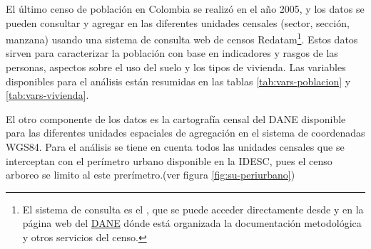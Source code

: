 \documentclass[12pt,]{book}
\let\rmarkdownfootnote\footnote%
\def\footnote{\protect\rmarkdownfootnote}
\begin{document}
El último censo de población en Colombia se realizó en el año 2005, y
los datos se pueden consultar y agregar en las diferentes unidades
censales (sector, sección, manzana) usando una sistema de consulta web
de censos Redatam\footnote{El sistema de consulta es el
  \citep{cepal_redatam_nodate}, que se puede acceder directamente desde
  \citep{dane_cepal_celade_2005} y en la página web del
  \href{http://www.dane.gov.co/index.php/estadisticas-por-tema/demografia-y-poblacion/censo-general-2005-1}{DANE}
  dónde está organizada la documentación metodológica y otros servicios
  del censo.}. Estos datos sirven para caracterizar la población con
base en indicadores y rasgos de las personas, aspectos sobre el uso del
suelo y los tipos de vivienda. Las variables disponibles para el
análisis están resumidas en las tablas \ref{tab:vars-poblacion} y
\ref{tab:vars-vivienda}.

El otro componente de los datos es la cartografía censal del DANE
\citep{geoportal_DANE} disponible para las diferentes unidades
espaciales de agregación en el sistema de coordenadas WGS84. Para el
análisis se tiene en cuenta todos las unidades censales que se
interceptan con el perímetro urbano disponible en la IDESC, pues el
censo arboreo se limito al este prerímetro.(ver figura
\ref{fig:su-periurbano})
\end{document}
